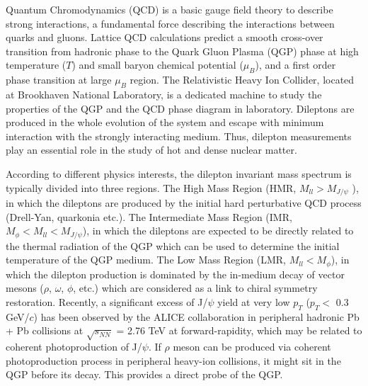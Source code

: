\begin{enabstract}
Quantum Chromodynamics (QCD) is a basic gauge field theory to describe strong interactions, a fundamental force describing the interactions between quarks and gluons. Lattice QCD calculations predict a smooth cross-over transition from hadronic phase to the Quark Gluon Plasma (QGP) phase at high temperature ($T$) and small baryon chemical potential ($\mu_{B}$), and a first order phase transition at large $\mu_{B}$ region. The Relativistic Heavy Ion Collider, located at Brookhaven National Laboratory, is a dedicated machine to study the properties of the QGP and the QCD phase diagram in laboratory. Dileptons are produced in the whole evolution of the system and escape with minimum interaction with the strongly interacting medium. Thus, dilepton measurements play an essential role in the study of hot and dense nuclear matter.

According to different physics interests, the dilepton invariant mass spectrum is typically divided into three regions. The High Mass Region (HMR, $M_{ll}>M_{J/\psi}$ ), in which the dileptons are produced by the initial hard perturbative QCD process (Drell-Yan, quarkonia etc.). The Intermediate Mass Region (IMR, $M_{\phi}<M_{ll}<M_{J/\psi}$), in which the dileptons are expected to be directly related to the thermal radiation of the QGP which can be used to determine the initial temperature of the QGP medium. The Low Mass Region (LMR, $M_{ll}<M_{\phi}$), in which the dilepton production is dominated by the in-medium decay of vector mesons ($\rho$, $\omega$, $\phi$, etc.) which are considered as a link to chiral symmetry restoration. Recently, a significant excess of J/$\psi$ yield at very low $p_{T}$ ($p_{T}<$ 0.3 GeV/$c$) has been observed by the ALICE collaboration in peripheral hadronic Pb + Pb collisions at $\sqrt{s_{NN}}$ = 2.76 TeV at forward-rapidity, which may be related to coherent photoproduction of J/$\psi$. If $\rho$ meson can be produced via coherent photoproduction process in peripheral heavy-ion collisions, it might sit in the QGP before its decay. This provides a direct probe of the QGP.


\end{enabstract}

